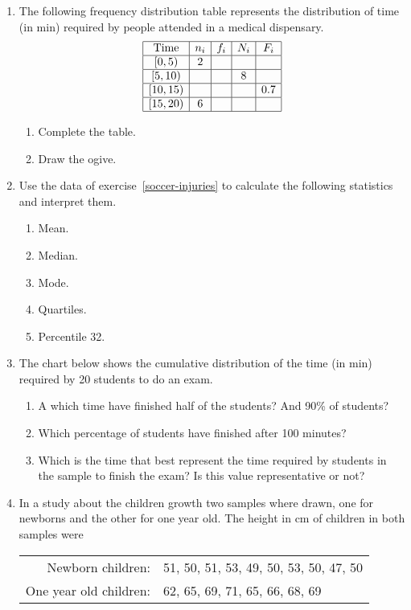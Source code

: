 \begin{enumerate}[leftmargin=*]
\item The following frequency distribution table represents the distribution of time (in min) required by people
attended in a medical dispensary. 
\[
\begin{array}{|c|c|c|c|c|}
\hline \mbox{Time} & n_{i} & f_{i} & N_{i} & F_{i}\\
\hline 
\left[ 0,5\right) & 2 &  &  &  \\ 
\hline 
\left[ 5,10\right) &  &  & 8 &  \\ 
\hline 
\left[ 10,15\right) &  & &  & 0.7 \\ 
\hline 
\left[ 15,20\right) & 6 &  &  &\\ 
\hline
\end{array}
\]

\begin{enumerate}
\item Complete the table.
\item Draw the ogive. 
\end{enumerate}

\item Use the data of exercise~\ref{soccer-injuries} to calculate the following statistics and interpret them.
\begin{enumerate}
\item Mean.
\item Median.
\item Mode.
\item Quartiles.
\item Percentile 32.
\end{enumerate}

\item The chart below shows the cumulative distribution of the time (in min) required by 20 students to do an exam.
\begin{center}
\resizebox{0.7\textwidth}{!}{}
\end{center}

\begin{enumerate}
\item A which time have finished half of the students? And 90\% of students?
\item Which percentage of students have finished after 100 minutes?
\item Which is the time that best represent the time required by students in the sample to finish the exam? Is this
value representative or not?
\end{enumerate}

\item In a study about the children growth two samples where drawn, one for newborns and the other for one year old. 
The height in cm of children in both samples were 
\begin{center}
\begin{tabular}{rl}
Newborn children: & 51, 50, 51, 53, 49, 50, 53, 50, 47, 50\\
One year old children: & 62, 65, 69, 71, 65, 66, 68, 69
\end{tabular}
\end{center}


\end{enumerate}
